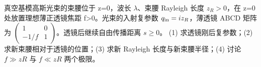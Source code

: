 真空基模高斯光束的束腰位于 z=0，波长 \(\lambda \)、束腰 Rayleigh 长度 \(z_R>0\)，在 z=0 处放置理想薄正透镜焦距 f>0。光束的入射复参数 \(q_{\rm in}=iz_R\)，薄透镜 ABCD 矩阵为 \(\begin{pmatrix}1&0\\-1/f&1\end{pmatrix}\)。透镜后继续自由传播距离 \(s\ge 0\)。
(1) 求透镜刚后复参数；(2) 求新束腰相对于透镜的位置；(3) 求新 Rayleigh 长度与新束腰半径；(4) 讨论 \(f\gg zR\) 与 \(f\ll zR\) 两个极限。
